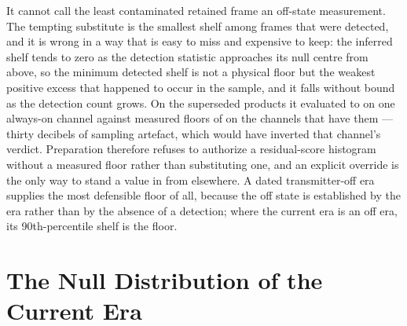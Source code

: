 It cannot call the least contaminated retained frame an off-state measurement.
The tempting substitute is the smallest shelf among frames that were detected,
and it is wrong in a way that is easy to miss and expensive to keep: the
inferred shelf tends to zero as the detection statistic approaches its null
centre from above, so the minimum detected shelf is not a physical floor but
the weakest positive excess that happened to occur in the sample, and it falls
without bound as the detection count grows.  On the superseded products it
evaluated to  on one always-on channel against measured floors
of  on the channels that have them --- thirty
decibels of sampling artefact, which would have inverted that channel's verdict.
Preparation therefore refuses to authorize a residual-score histogram without
a measured floor rather than substituting one, and an explicit override is the
only way to stand a value in from elsewhere.  A dated transmitter-off era
supplies the most defensible floor of all, because the off state is
established by the era rather than by the absence of a detection; where the
current era is an off era, its 90th-percentile shelf is the floor.

\section{The Null Distribution of the Current Era}
\label{sec:calibration:nulls}

